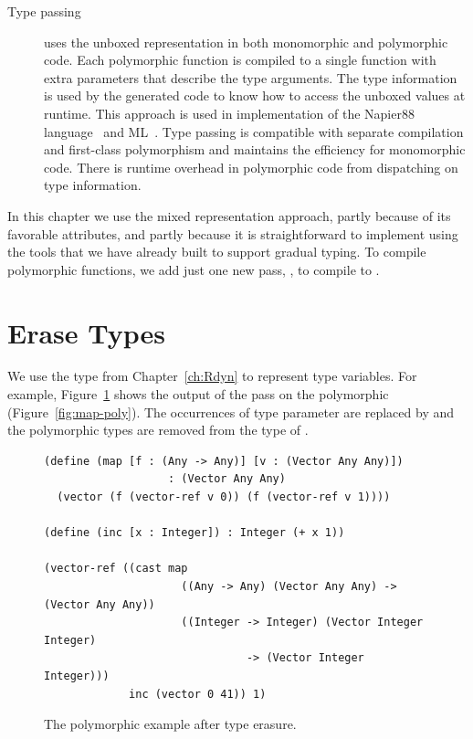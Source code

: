 \documentclass[7x10]{TimesAPriori_MIT}%
\begin{document}
\begin{description}
\item[Type passing] uses the unboxed representation in both
  monomorphic and polymorphic code. Each polymorphic function is
  compiled to a single function with extra parameters that describe
  the type arguments. The type information is used by the generated
  code to know how to access the unboxed values at runtime. This
  approach is used in implementation of the Napier88
  language~\citep{Morrison:1991aa} and ML~\citep{Harper:1995um}.  Type
  passing is compatible with separate compilation and first-class
  polymorphism and maintains the efficiency for monomorphic
  code. There is runtime overhead in polymorphic code from dispatching
  on type information.
\end{description}

In this chapter we use the mixed representation approach, partly
because of its favorable attributes, and partly because it is
straightforward to implement using the tools that we have already
built to support gradual typing. To compile polymorphic functions, we
add just one new pass, , to compile \LangInst{} to
\LangCast{}.

\section{Erase Types}
\label{sec:erase-types}

We use the  type from Chapter~\ref{ch:Rdyn} to
represent type variables. For example, Figure~\ref{fig:map-erase}
shows the output of the  pass on the polymorphic
 (Figure~\ref{fig:map-poly}). The occurrences of
type parameter  are replaced by  and the polymorphic
 types are removed from the type of . 

\begin{figure}[tbp]
\begin{lstlisting}
(define (map [f : (Any -> Any)] [v : (Vector Any Any)])
                   : (Vector Any Any)
  (vector (f (vector-ref v 0)) (f (vector-ref v 1))))

(define (inc [x : Integer]) : Integer (+ x 1))

(vector-ref ((cast map
                     ((Any -> Any) (Vector Any Any) -> (Vector Any Any))  
                     ((Integer -> Integer) (Vector Integer Integer)
                               -> (Vector Integer Integer)))
             inc (vector 0 41)) 1)
\end{lstlisting}
\caption{The polymorphic  example after type erasure.}
\label{fig:map-erase}
\end{figure}
\end{document}
